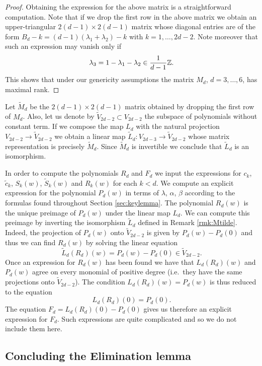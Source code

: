 \begin{proof}
Obtaining the expression for the above matrix is a straightforward computation. Note that if we drop the first row in the above matrix we obtain an upper-triangular $2(d-1)\times2(d-1)$ matrix whose diagonal entries are of the form $B_d-k=(d-1)(\lambda_1+\lambda_2)-k$ with $k=1,\ldots,2d-2$. Note moreover that such an expression may vanish only if
\[ \lambda_3=1-\lambda_1-\lambda_2\in\frac{1}{d-1}\mathbb{Z}. \]
This shows that under our genericity assumptions the matrix $M_d$, $d=3,\dots,6$, has maximal rank.
\end{proof}

\begin{remark}\label{rmk:Mtilde}
Let $\tilde{M}_d$ be the $2(d-1)\times2(d-1)$ matrix obtained by dropping the first row of $M_d$. Also, let us denote by $\tilde{V}_{2d-2}\subset V_{2d-2}$ the subspace of polynomials without constant term. If we compose the map $L_d$ with the natural projection $V_{2d-2}\to \tilde{V}_{2d-2}$ we obtain a linear map $\tilde{L}_d\colon V_{2d-3}\to\tilde{V}_{2d-2}$ whose matrix representation is precisely $\tilde{M}_d$. Since $\tilde{M}_d$ is invertible we conclude that $\tilde{L}_d$ is an isomorphism.
\end{remark}

In order to compute the polynomials $R_d$ and $F_d$ we input the expressions for $c_k$, $\tilde{c}_k$, $S_k(w)$, $\widetilde{S}_k(w)$ and $R_k(w)$ for each $k<d$. We compute an explicit expression for the polynomial $P_d(w)$ in terms of $\lambda$, $\alpha$, $\beta$ according to the formulas found throughout Section \ref{sec:keylemma}. The polynomial $R_d(w)$ is the unique preimage of $P_d(w)$ under the linear map $L_d$. We can compute this preimage by inverting the isomorphism $\tilde{L}_d$ defined in Remark \ref{rmk:Mtilde}. Indeed, the projection of $P_d(w)$ onto $\tilde{V}_{2d-2}$ is given by $P_d(w)-P_d(0)$ and thus we can find $R_d(w)$ by solving the linear equation
\[ \tilde{L}_d(R_d)(w)=P_d(w)-P_d(0)\in\tilde{V}_{2d-2}. \]
Once an expression for $R_d(w)$ has been found we have that $L_d(R_d)(w)$ and $P_d(w)$ agree on every monomial of positive degree (i.e.~they have the same projections onto $\tilde{V}_{2d-2}$). The condition $L_d(R_d)(w)=P_d(w)$ is thus reduced to the equation
\[ L_d(R_d)(0)=P_d(0). \]
The equation $F_d=L_d(R_d)(0)-P_d(0)$ gives us therefore an explicit expression for $F_d$. Such expressions are quite complicated and so we do not include them here.


\subsection{Concluding the Elimination lemma}\label{subsec:concludingelimination}

